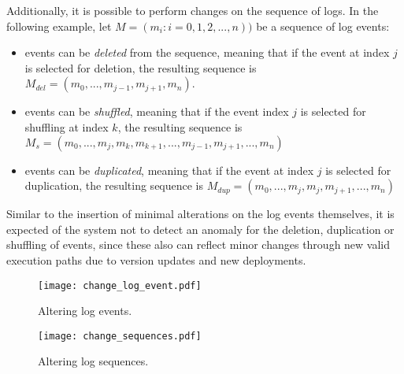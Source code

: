 Additionally, it is possible to perform changes on the sequence of logs. In the following example, let $M = (m_i : i = 0, 1, 2, ..., n))$ be a sequence of log events:
\begin{itemize}
	\setlength\itemsep{-0.5em}
	\item events can be \textit{deleted} from the sequence, meaning that if the event at index $j$ is selected for deletion, the resulting sequence is $M_{del} = (m_0, ..., m_{j-1}, m_{j+1}, m_n)$.
	\item events can be \textit{shuffled}, meaning that if the event index $j$ is selected for shuffling at index $k$, the resulting sequence is $M_s = (m_0, ..., m_j, m_k, m_{k+1}, ..., m_{j-1}, m_{j+1}, ..., m_n)$
	\item events can be \textit{duplicated}, meaning that if the event at index $j$ is selected for duplication, the resulting sequence is $M_{dup} = (m_0, ..., m_j, m_j, m_{j+1}, ..., m_n)$
\end{itemize}

Similar to the insertion of minimal alterations on the log events themselves, it is expected of the system not to detect an anomaly for the deletion, duplication or shuffling of events, since these also can reflect minor changes through new valid execution paths due to version updates and new deployments.
\vfill

\begin{figure}[H]
	\centering
	\texttt{[image: change\_log\_event.pdf]}
	\caption{Altering log events.}
	\label{fig:changelogevent}
\end{figure}

\begin{figure}[H]
	\centering
	\texttt{[image: change\_sequences.pdf]}
	\caption{Altering log sequences.}
	\label{fig:changesequence}
\end{figure}

\begin{comment}
\begin{figure}[!tbp]
  \centering
  \subfloat[Altering log events.]{\texttt{[image: change\_log\_event.pdf]}\label{fig:changelogevent}}
  \hfill
  \subfloat[Altering log sequences.]{\texttt{[image: change\_sequences.pdf]}\label{fig:changesequence}}
  \caption{Alteration of log events and sequences.}
\end{figure}
\end{comment}


